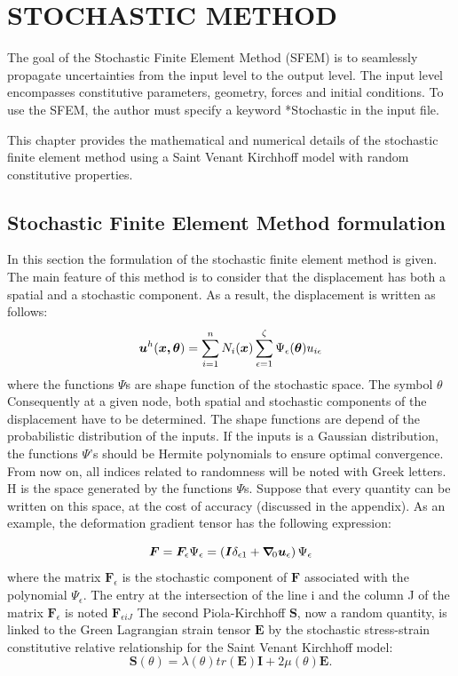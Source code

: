 \documentclass[oneside,11pt,times]{book}
\begin{document}
\chapter{STOCHASTIC METHOD}

The goal of the Stochastic Finite Element Method (SFEM) is to seamlessly propagate uncertainties from the input level to the output level. The input level encompasses constitutive parameters, geometry, forces and initial conditions. To use the SFEM, the author must specify a keyword *Stochastic in the input file.

This chapter provides the mathematical and numerical details of the stochastic finite element method using a Saint Venant Kirchhoff model with random constitutive properties.

\section{Stochastic Finite Element Method formulation}
In this section the formulation of the stochastic finite element method is given. The main feature of this method is to consider that the displacement has both a spatial and a stochastic component. As a result, the displacement is written as follows:
\begin{equation}\label{eq:2-stochastic}
\centering
\bm{u}^{h}(\bm{x,\theta})=\sum\limits_{i=1}^{n} N_i(\bm{x}) \sum\limits_{\epsilon=1}^{\zeta}\Psi_\epsilon(\bm{\theta})u_{i \epsilon}
\end{equation}
where the functions $\Psi$s are shape function of the stochastic space. The symbol $\theta$ Consequently at a given node, both spatial and stochastic components of the displacement have to be determined. The shape functions are depend of the probabilistic distribution of the inputs. If the inputs is a Gaussian distribution, the functions $\Psi$'s should be Hermite polynomials to ensure optimal convergence. From now on, all indices related to randomness will be noted with Greek letters. H is the space generated by the functions $\Psi$s. Suppose that every quantity can be written on this space, at the cost of accuracy (discussed in the appendix). As an example, the deformation gradient tensor has the following expression:

\begin{equation}\label{eq:2-stochastic}
\centering
\bm{F} = \bm{F}_{\epsilon}\Psi_\epsilon = \left(\bm{I}\delta_{\epsilon1} + \bm{\nabla}\!_0 \bm{u}_{\epsilon}\right) \Psi_\epsilon
\end{equation}
where the matrix $\bm{F}_{\epsilon}$ is the stochastic component of $\bm{F}$ associated with the polynomial $\Psi_{\epsilon}$. The entry at the intersection of the line i and the column J of the matrix $\bm{F}_{\epsilon}$ is noted $\bm{F}_{\epsilon iJ}$
The second Piola-Kirchhoff $\bm{S}$, now a random quantity, is linked to the Green Lagrangian strain tensor $\bm{E}$ by the stochastic stress-strain constitutive relative relationship for the Saint Venant Kirchhoff model:
\begin{equation}
    \bm{S}(\theta) = \lambda(\theta) tr(\bm{E})\bm{I} + 2\mu(\theta) \bm{E}.
\end{equation}
\end{document}
